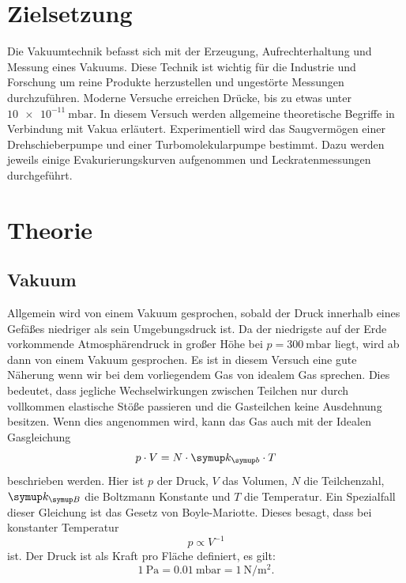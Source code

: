 \section{Zielsetzung}
	
	Die Vakuumtechnik befasst sich mit der Erzeugung, Aufrechterhaltung und Messung eines Vakuums.
	Diese Technik ist wichtig für die Industrie und Forschung um reine Produkte herzustellen und ungestörte Messungen durchzuführen.
	Moderne Versuche erreichen Drücke, bis zu etwas unter $\SI{10e-11}{\milli\bar}$.
	In diesem Versuch werden allgemeine theoretische Begriffe in Verbindung mit Vakua erläutert.
	Experimentiell wird das Saugvermögen einer Drehschieberpumpe und einer Turbomolekularpumpe bestimmt.
	Dazu werden jeweils einige Evakurierungskurven aufgenommen und Leckratenmessungen durchgeführt.
	

\section{Theorie}
	
	\subsection{Vakuum}
		
		Allgemein wird von einem Vakuum gesprochen, sobald der Druck innerhalb eines Gefäßes niedriger als sein Umgebungsdruck ist.
		Da der niedrigste auf der Erde vorkommende Atmosphärendruck in großer Höhe bei $p = \SI{300}{\milli\bar}$ liegt, wird ab dann von einem Vakuum gesprochen.
		Es ist in diesem Versuch eine gute Näherung wenn wir bei dem vorliegendem Gas von idealem Gas sprechen. 
		Dies bedeutet, dass jegliche Wechselwirkungen zwischen Teilchen nur durch vollkommen elastische Stöße passieren und die Gasteilchen keine Ausdehnung besitzen.
		Wenn dies angenommen wird, kann das Gas auch mit der Idealen Gasgleichung
		\begin{equation}
			p \cdot V = N \cdot \symup k _{\symup b} \cdot T
		\end{equation}
		beschrieben werden.
		Hier ist $p$ der Druck, $V$ das Volumen, $N$ die Teilchenzahl, $\symup k _{\symup B}$ die Boltzmann Konstante und $T$ die Temperatur. 
		Ein Spezialfall dieser Gleichung ist das Gesetz von Boyle-Mariotte. Dieses besagt, dass bei konstanter Temperatur
		\begin{equation}
			p \propto V^{-1}
		\end{equation}
		ist.
		Der Druck ist als Kraft pro Fläche definiert, es gilt:
		\begin{equation}
		\SI{1}{\pascal} = \SI{0.01}{\milli\bar} = \SI{1}{\newton\per\metre\squared}.
		\end{equation}

